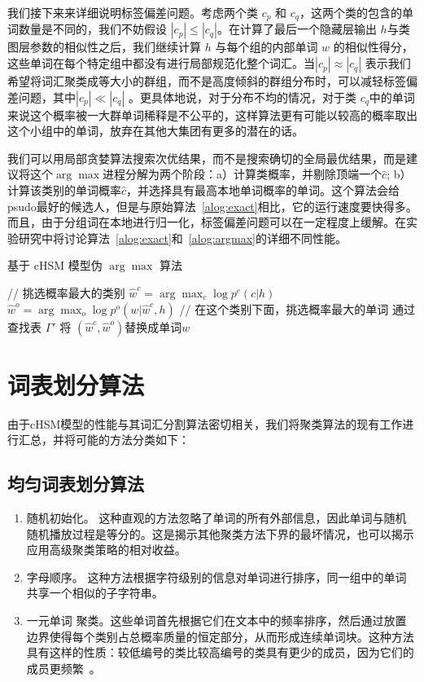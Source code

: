 我们接下来来详细说明标签偏差问题。考虑两个类 $ c_p $ 和 $ c_q $，这两个类的包含的单词数量是不同的，我们不妨假设 $| c_p | \le | c_q |$。在计算了最后一个隐藏层输出 $h$与类图层参数的相似性之后，我们继续计算 $h$ 与每个组的内部单词 $w$ 的相似性得分，这些单词在每个特定组中都没有进行局部规范化整个词汇。当$ | c_p | \approx|c_q|$ 表示我们希望将词汇聚类成等大小的群组，而不是高度倾斜的群组分布时，可以减轻标签偏差问题，其中$ | c_p | \ll | c_q | $ 。更具体地说，对于分布不均的情况，对于类 $ c_q $中的单词来说这个概率被一大群单词稀释是不公平的，这样算法更有可能以较高的概率取出这个小组中的单词，放弃在其他大集团有更多的潜在的话。

我们可以用局部贪婪算法搜索次优结果，而不是搜索确切的全局最优结果，而是建议将这个$ \arg\max $进程分解为两个阶段：a）计算类概率，并剔除顶端一个$ \hat c $; b）计算该类别的单词概率$ \hat c $，并选择具有最高本地单词概率的单词。这个算法会给psudo最好的候选人，但是与原始算法~\ref{alog:exact}相比，它的运行速度要快得多。而且，由于分组词在本地进行归一化，标签偏差问题可以在一定程度上缓解。在实验研究中将讨论算法~\ref{alog:exact}和~\ref{alog:argmax}的详细不同性能。
\begin{algorithm}[!ht]
 \caption{基于 cHSM 模型伪 $\arg\max$ 算法}\label{alog:cargmax}
{// 挑选概率最大的类别}\;
 {$\hat w^c=\arg\max_c{\log p^c(c|h)}$ }\;
 {$\hat w^o=\arg\max_o{\log p^o(w|\hat w^c,h)}$}\;
 {// 在这个类别下面，挑选概率最大的单词}\;
 {通过查找表 $\Gamma'$ 将 $(\hat w^c,\hat w^o)$替换成单词$w$ }\;
\end{algorithm}

\section{词表划分算法}
由于cHSM模型的性能与其词汇分割算法密切相关，我们将聚类算法的现有工作进行汇总，并将可能的方法分类如下：

\subsection{均匀词表划分算法}
\begin{enumerate}
\item 随机初始化。 这种直观的方法忽略了单词的所有外部信息，因此单词与随机随机播放过程是等分的。这是揭示其他聚类方法下界的最坏情况，也可以揭示应用高级聚类策略的相对收益。
\item 字母顺序。 这种方法根据字符级别的信息对单词进行排序，同一组中的单词共享一个相似的子字符串。
\item 一元单词 聚类。这些单词首先根据它们在文本中的频率排序，然后通过放置边界使得每个类别占总概率质量的恒定部分，从而形成连续单词块。这种方法具有这样的性质：较低编号的类比较高编号的类具有更少的成员，因为它们的成员更频繁~。
\end{enumerate}

